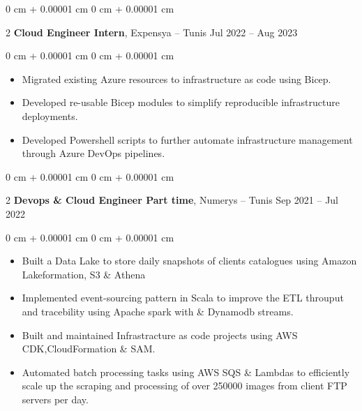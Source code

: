 \documentclass[10pt, letterpaper]{article}
\newenvironment{highlights}{ \begin{itemize}[ topsep=0.10 cm, parsep=0.10 cm, partopsep=0pt,
itemsep=0pt, leftmargin=0 cm + 10pt ] }{ \end{itemize} } %
\newenvironment{onecolentry}{ \begin{adjustwidth}{ 0 cm + 0.00001 cm }{ 0 cm + 0.00001 cm }
}{ \end{adjustwidth} } %
\newenvironment{twocolentry}[2][]{ \onecolentry \def\secondColumn{#2} \setcolumnwidth{\fill, 4.5 cm}
\begin{paracol}{2} }{ \switchcolumn \raggedleft \secondColumn \end{paracol}
\endonecolentry } %
\begin{document}
    \vspace{0.3 cm}

    \begin{twocolentry}
        { Jul 2022 – Aug 2023 } \textbf{Cloud Engineer Intern}, Expensya --
        Tunis
    \end{twocolentry}

    \vspace{0.10 cm}
    \begin{onecolentry}
        \begin{highlights}
        \item Migrated existing Azure resources to infrastructure as code using Bicep.
        \item Developed re-usable Bicep modules to simplify reproducible infrastructure deployments.
        \item Developed Powershell scripts to further automate infrastructure management through Azure DevOps pipelines.
        \end{highlights}
    \end{onecolentry}


    \vspace{0.3 cm}

    \begin{twocolentry}
        { Sep 2021 – Jul 2022 } \textbf{Devops \& Cloud Engineer Part time}, Numerys -- 
        Tunis
    \end{twocolentry}

    \vspace{0.10 cm}
    \begin{onecolentry}
        \begin{highlights}
					\item Built a Data Lake to store daily snapshots of clients catalogues using Amazon Lakeformation, S3 \& Athena
					\item Implemented event-sourcing pattern in Scala to improve the ETL throuput and tracebility using Apache spark with \& Dynamodb streams.
					\item Built and maintained Infrastracture as code projects using AWS CDK,CloudFormation \& SAM.
					\item Automated batch processing tasks using AWS SQS \& Lambdas to efficiently scale up the scraping and processing of over 250000 images from client FTP servers per day. \
				\end{highlights}
    \end{onecolentry}

		\vspace{0.3 cm}
\end{document}
